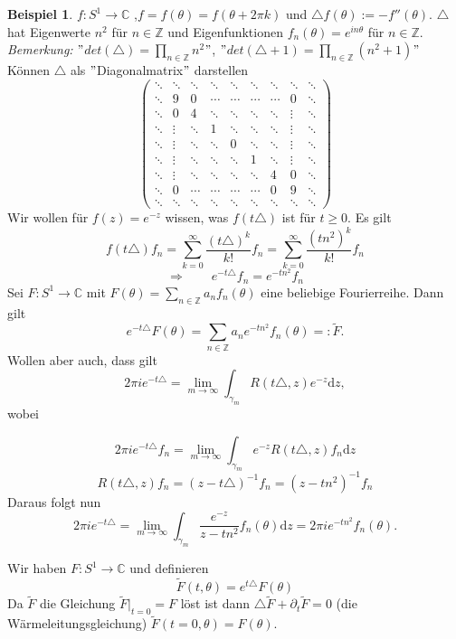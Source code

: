 \documentclass[11pt,titlepage]{article}
\theoremstyle{definition}
\newtheorem{example}[theorem]{Beispiel}
\theoremstyle{remark}
\begin{document}
	\begin{example}
		$f:S^1\to\mathbb{C}$ ,$f=f(\theta)=f(\theta +2\pi k)$ und $\triangle f(\theta):=-f''(\theta)$.
		$\triangle$ hat Eigenwerte $n^2$ für $n\in\mathbb{Z}$ und Eigenfunktionen 
		$f_n(\theta)=e^{in\theta}$ für $n\in\mathbb{Z}$. \\
		\textsl{Bemerkung:} $"$$det(\triangle)=\prod_{n\in\mathbb{Z}} n^2$$"$, 
		$"$$det(\triangle +1)=\prod_{n\in\mathbb{Z}} (n^2 +1)$$"$ \\
		Können $\triangle$ als $"$Diagonalmatrix$"$ darstellen
		\[ \begin{pmatrix} \ddots & \ddots & \ddots & \ddots & \ddots & \ddots & \ddots & \ddots & \ddots \\
					  \ddots & 9 & 0 & \cdots & \cdots & \cdots & \cdots & 0 & \ddots \\
					  \ddots & 0 & 4 & \ddots & \ddots & \ddots & \ddots & \vdots & \ddots \\
					  \ddots & \vdots & \ddots & 1 & \ddots & \ddots & \ddots & \vdots & \ddots \\
					  \ddots & \vdots & \ddots & \ddots & 0 & \ddots & \ddots & \vdots & \ddots \\
					  \ddots & \vdots & \ddots & \ddots & \ddots & 1 & \ddots & \vdots & \ddots \\
					  \ddots & \vdots & \ddots & \ddots & \ddots & \ddots & 4 & 0 & \ddots \\
					  \ddots & 0 & \cdots & \cdots & \cdots & \cdots & 0 & 9 & \ddots \\
					  \ddots & \ddots & \ddots & \ddots & \ddots & \ddots & \ddots & \ddots & \ddots
		\end{pmatrix} \]
		Wir wollen für $f(z)=e^{-z}$ wissen, was $f(t\triangle)$ ist für $t\geq 0$. Es gilt 
		\[ f(t\triangle)f_n =\sum_{k=0}^{\infty} \frac{(t\triangle)^k}{k!} f_n =\sum_{k=0}^{\infty} 
		\frac{(tn^2)^k}{k!}f_n \]
		\[\Rightarrow\qquad e^{-t \triangle}f_n =e^{-tn^2}f_n \]
		Sei $F:S^1\to\mathbb{C}$ mit $F(\theta)=\sum_{n\in\mathbb{Z}} a_n f_n(\theta)$ eine beliebige 
		Fourierreihe. Dann gilt
		\[  e^{-t\triangle} F(\theta)=\sum_{n\in\mathbb{Z}}a_n e^{-tn^2}f_n(\theta)=: \tilde{F}.\]
		Wollen aber auch, dass gilt 
		\[ 2\pi i e^{-t\triangle}=\lim_{m\to\infty} \int_{\gamma_m} R(t\triangle,z)e^{-z}\mathrm{d}z, \]
		wobei
		
		
		\[ 2\pi i e^{-t\triangle}f_n=\lim_{m\to\infty}\int_{\gamma_m} e^{-z}R(t\triangle,z)f_n\mathrm{d}z \]
		\[ R(t\triangle,z)f_n=(z-t\triangle)^{-1}f_n = (z-tn^2)^{-1}f_n \]
		Daraus folgt nun
		\[ 2\pi i e^{-t\triangle}=\lim_{m\to\infty}\int_{\gamma_m}\frac{e^{-z}}{z-tn^2}f_n(\theta)\mathrm{d}z 
		= 2\pi i e^{-tn^2}f_n(\theta). \]
	\end{example}
	
	 Wir haben $F:S^1\to\mathbb{C}$ und definieren
	\[ \tilde{F}(t,\theta)=e^{t\triangle} F(\theta) \]
	Da $\tilde{F}$ die Gleichung $\tilde{F}|_{t=0}=F$ löst ist dann $\triangle\tilde{F}+\partial_t \tilde{F}=0$ 
	(die Wärmeleitungsgleichung) $\tilde{F}(t=0,\theta)=F(\theta)$.
	
		
\end{document}
